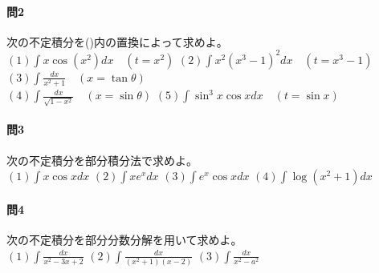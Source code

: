 \documentclass[a4j,dvipdfmx]{jsarticle}
\begin{document}
            \paragraph{問2}次の不定積分を(\hspace{1mm})内の置換によって求めよ。\\
                $(1)\displaystyle \int x\cos(x^2)dx \quad (t=x^2)$\hspace{3mm}
                $(2)\displaystyle \int x^2(x^3-1)^2dx\quad (t=x^3-1)$\hspace{3mm}
                $(3)\displaystyle \int \frac{dx}{x^2+1}\quad (x=\tan \theta)$\\
                $(4)\displaystyle \int \frac{dx}{\sqrt{1-x^2}}\quad (x=\sin \theta)$\hspace{3mm}
                $(5)\displaystyle \int \sin^3 x\cos x dx \quad(t=\sin x)$\\
            
            \paragraph{問3}次の不定積分を部分積分法で求めよ。\\
                $(1)\displaystyle \int x\cos xdx$\hspace{3mm}
                $(2)\displaystyle \int xe^x dx$\hspace{3mm}
                $(3)\displaystyle \int e^x\cos xdx$\hspace{3mm}
                $(4)\displaystyle \int \log(x^2+1)dx$\\

            \paragraph{問4}次の不定積分を部分分数分解を用いて求めよ。\\
                $(1)\displaystyle \int \frac{dx}{x^2-3x+2}$\hspace{20mm}
                $(2)\displaystyle \int \frac{dx}{(x^2+1)(x-2)}$\hspace{20mm}
                $(3)\displaystyle \int \frac{dx}{x^2-a^2}$\\
\end{document}

